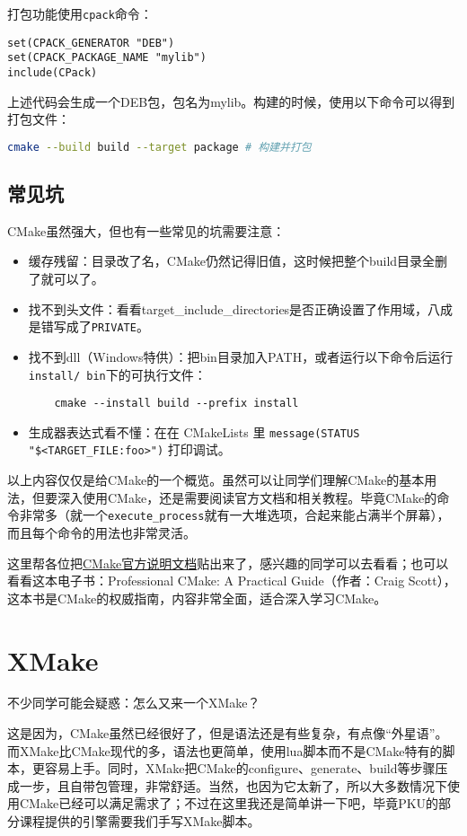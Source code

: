 打包功能使用\texttt{cpack}命令：
\begin{lstlisting}
set(CPACK_GENERATOR "DEB")
set(CPACK_PACKAGE_NAME "mylib")
include(CPack)
\end{lstlisting}
上述代码会生成一个DEB包，包名为mylib。构建的时候，使用以下命令可以得到打包文件：
\begin{lstlisting}[language=bash]
cmake --build build --target package # 构建并打包
\end{lstlisting}

\subsection{常见坑}
CMake虽然强大，但也有一些常见的坑需要注意：
\begin{itemize}
  \item 缓存残留：目录改了名，CMake仍然记得旧值，这时候把整个build目录全删了就可以了。
  \item 找不到头文件：看看target\_include\_directories是否正确设置了作用域，八成是错写成了\texttt{PRIVATE}。
  \item 找不到dll（Windows特供）：把bin目录加入PATH，或者运行以下命令后运行\texttt{install/ bin}下的可执行文件：
\begin{lstlisting}
    cmake --install build --prefix install
\end{lstlisting}
  \item 生成器表达式看不懂：在在 CMakeLists 里 \texttt{message(STATUS "\$<TARGET\_FILE:foo>")} 打印调试。
\end{itemize}

以上内容仅仅是给CMake的一个概览。虽然可以让同学们理解CMake的基本用法，但要深入使用CMake，还是需要阅读官方文档和相关教程。毕竟CMake的命令非常多（就一个\texttt{execute\_process}就有一大堆选项，合起来能占满半个屏幕），而且每个命令的用法也非常灵活。

这里帮各位把\href{https://cmake.org/cmake/help/latest/guide/tutorial/}{CMake官方说明文档}贴出来了，感兴趣的同学可以去看看；也可以看看这本电子书：Professional CMake: A Practical Guide（作者：Craig Scott），这本书是CMake的权威指南，内容非常全面，适合深入学习CMake。

\section{XMake}

不少同学可能会疑惑：怎么又来一个XMake？

这是因为，CMake虽然已经很好了，但是语法还是有些复杂，有点像“外星语”。而XMake比CMake现代的多，语法也更简单，使用lua脚本而不是CMake特有的脚本，更容易上手。同时，XMake把CMake的configure、generate、build等步骤压成一步，且自带包管理，非常舒适。当然，也因为它太新了，所以大多数情况下使用CMake已经可以满足需求了；不过在这里我还是简单讲一下吧，毕竟PKU的部分课程提供的引擎需要我们手写XMake脚本。

